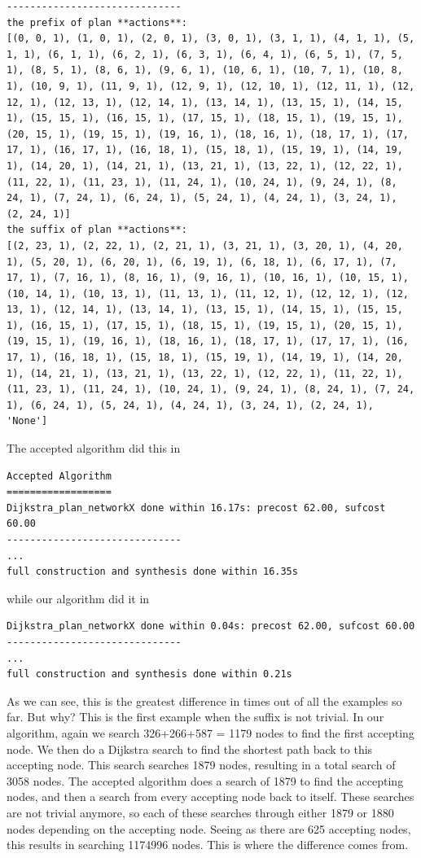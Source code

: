 \begin{lstlisting}
------------------------------
the prefix of plan **actions**:
[(0, 0, 1), (1, 0, 1), (2, 0, 1), (3, 0, 1), (3, 1, 1), (4, 1, 1), (5, 1, 1), (6, 1, 1), (6, 2, 1), (6, 3, 1), (6, 4, 1), (6, 5, 1), (7, 5, 1), (8, 5, 1), (8, 6, 1), (9, 6, 1), (10, 6, 1), (10, 7, 1), (10, 8, 1), (10, 9, 1), (11, 9, 1), (12, 9, 1), (12, 10, 1), (12, 11, 1), (12, 12, 1), (12, 13, 1), (12, 14, 1), (13, 14, 1), (13, 15, 1), (14, 15, 1), (15, 15, 1), (16, 15, 1), (17, 15, 1), (18, 15, 1), (19, 15, 1), (20, 15, 1), (19, 15, 1), (19, 16, 1), (18, 16, 1), (18, 17, 1), (17, 17, 1), (16, 17, 1), (16, 18, 1), (15, 18, 1), (15, 19, 1), (14, 19, 1), (14, 20, 1), (14, 21, 1), (13, 21, 1), (13, 22, 1), (12, 22, 1), (11, 22, 1), (11, 23, 1), (11, 24, 1), (10, 24, 1), (9, 24, 1), (8, 24, 1), (7, 24, 1), (6, 24, 1), (5, 24, 1), (4, 24, 1), (3, 24, 1), (2, 24, 1)]
the suffix of plan **actions**:
[(2, 23, 1), (2, 22, 1), (2, 21, 1), (3, 21, 1), (3, 20, 1), (4, 20, 1), (5, 20, 1), (6, 20, 1), (6, 19, 1), (6, 18, 1), (6, 17, 1), (7, 17, 1), (7, 16, 1), (8, 16, 1), (9, 16, 1), (10, 16, 1), (10, 15, 1), (10, 14, 1), (10, 13, 1), (11, 13, 1), (11, 12, 1), (12, 12, 1), (12, 13, 1), (12, 14, 1), (13, 14, 1), (13, 15, 1), (14, 15, 1), (15, 15, 1), (16, 15, 1), (17, 15, 1), (18, 15, 1), (19, 15, 1), (20, 15, 1), (19, 15, 1), (19, 16, 1), (18, 16, 1), (18, 17, 1), (17, 17, 1), (16, 17, 1), (16, 18, 1), (15, 18, 1), (15, 19, 1), (14, 19, 1), (14, 20, 1), (14, 21, 1), (13, 21, 1), (13, 22, 1), (12, 22, 1), (11, 22, 1), (11, 23, 1), (11, 24, 1), (10, 24, 1), (9, 24, 1), (8, 24, 1), (7, 24, 1), (6, 24, 1), (5, 24, 1), (4, 24, 1), (3, 24, 1), (2, 24, 1), 'None']
\end{lstlisting} 

The accepted algorithm did this in 
\begin{lstlisting}
Accepted Algorithm
==================
Dijkstra_plan_networkX done within 16.17s: precost 62.00, sufcost 60.00
------------------------------
...
full construction and synthesis done within 16.35s 
\end{lstlisting}
while our algorithm did it in
\begin{lstlisting}
Dijkstra_plan_networkX done within 0.04s: precost 62.00, sufcost 60.00
------------------------------
...
full construction and synthesis done within 0.21s 
\end{lstlisting}
As we can see, this is the greatest difference in times out of all the examples so far. But why? This is the first example when the suffix is not trivial. In our algorithm, again we search 326+266+587 = 1179 nodes to find the first accepting node. We then do a Dijkstra search to find the shortest path back to this accepting node. This search searches 1879 nodes, resulting in a total search of 3058 nodes. The accepted algorithm does a search of 1879 to find the accepting nodes, and then a search from every accepting node back to itself. These searches are not trivial anymore, so each of these searches through either 1879 or 1880 nodes depending on the accepting node. Seeing as there are 625 accepting nodes, this results in searching 1174996 nodes. This is where the difference comes from. 


